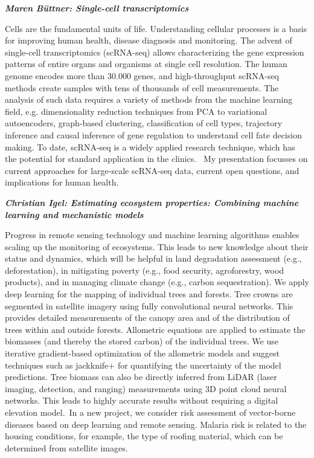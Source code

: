 \emph{\textbf{Maren Büttner: Single-cell transcriptomics}}

Cells are the fundamental units of life. Understanding cellular
processes is a basis for improving human health, disease diagnosis and
monitoring. The advent of single-cell transcriptomics (scRNA-seq) allows
characterizing the gene expression patterns of entire organs and
organisms at single cell resolution. The human genome encodes more than
30.000 genes, and high-throughput scRNA-seq methods create samples with
tens of thousands of cell measurements. The analysis of such data
requires a variety of methods from the machine learning field, e.g.
dimensionality reduction techniques from PCA to variational
autoencoders, graph-based clustering, classification of cell types,
trajectory inference and causal inference of gene regulation to
understand cell fate decision making. To date, scRNA-seq is a widely
applied research technique, which has the potential for standard
application in the clinics.~ My presentation focusses on current
approaches for large-scale scRNA-seq data, current open questions, and
implications for human health.~~~~~~

\emph{\textbf{Christian Igel: Estimating ecosystem properties: Combining
machine learning and mechanistic models}}

Progress in remote sensing technology and machine learning algorithms
enables scaling up the monitoring of ecosystems. This leads to new
knowledge about their status and dynamics, which will be helpful in land
degradation assessment (e.g., deforestation), in mitigating poverty
(e.g., food security, agroforestry, wood products), and in managing
climate change (e.g., carbon sequestration). We apply deep learning for
the mapping of individual trees and forests. Tree crowns are segmented
in satellite imagery using fully convolutional neural networks. This
provides detailed measurements of the canopy area and of the
distribution of trees within and outside forests. Allometric equations
are applied to estimate the biomasses (and thereby the stored carbon) of
the individual trees. We use iterative gradient-based optimization of
the allometric models and suggest techniques such as jackknife+ for
quantifying the uncertainty of the model predictions. Tree biomass can
also be directly inferred from LiDAR (laser imaging, detection, and
ranging) measurements using 3D point cloud neural networks. This leads
to highly accurate results without requiring a digital elevation
model.~In a new project, we consider risk assessment of vector-borne
diseases based on deep learning and remote sensing. Malaria risk is
related to the housing conditions, for example, the type of roofing
material, which can be determined from satellite images.

